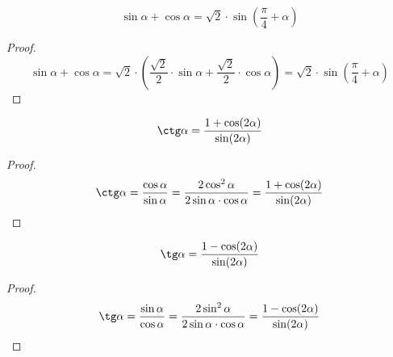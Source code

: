 \documentclass[12pt]{article}
\begin{document}
    \begin{statement}
        $$\sin\alpha+\cos\alpha=\sqrt{2}\cdot\sin\left(\dfrac{\pi}{4}+\alpha\right)$$
    \end{statement}
    \begin{proof}
        $$\sin\alpha+\cos\alpha=\sqrt{2}\cdot\left(\dfrac{\sqrt{2}}{2}\cdot\sin\alpha+\dfrac{\sqrt{2}}{2}\cdot\cos\alpha\right)=\sqrt{2}\cdot\sin\left(\dfrac{\pi}{4}+\alpha\right)$$
    \end{proof}
    \begin{statement}
        $$\ctg\alpha=\dfrac{1+\cos(2\alpha)}{\sin(2\alpha)}$$
    \end{statement}
    \begin{proof}
        $$\ctg\alpha=\dfrac{\cos\alpha}{\sin\alpha}=\dfrac{2\cos^2\alpha}{2\sin\alpha\cdot\cos\alpha}=\dfrac{1+\cos(2\alpha)}{\sin(2\alpha)}$$
    \end{proof}
    \begin{statement}
        $$\tg\alpha=\dfrac{1-\cos(2\alpha)}{\sin(2\alpha)}$$
    \end{statement}
    \begin{proof}
        $$\tg\alpha=\dfrac{\sin\alpha}{\cos\alpha}=\dfrac{2\sin^2\alpha}{2\sin\alpha\cdot\cos\alpha}=\dfrac{1-\cos(2\alpha)}{\sin(2\alpha)}$$
    \end{proof}
\end{document}

